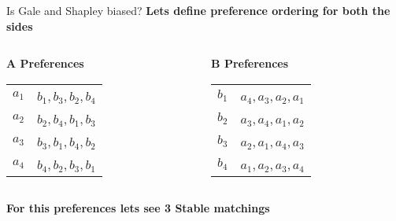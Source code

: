 \documentclass[aspectratio=169,xcolor=dvipsnames]{beamer}
\begin{document}
\begin{frame}{Is Gale and Shapley biased?}
\small
\textbf{Lets define preference ordering for both the sides}

\begin{columns}[t]
    \begin{column}{0.45\textwidth}
      \textbf{A Preferences}\\[6pt]
      \begin{tabular}{r@{: }l}
        $a_1$ & $b_1$,\,$b_3$,\,$b_2$,\,$b_4$ \\
        $a_2$ & $b_2$,\,$b_4$,\,$b_1$,\,$b_3$ \\
        $a_3$ & $b_3$,\,$b_1$,\,$b_4$,\,$b_2$ \\
        $a_4$ & $b_4$,\,$b_2$,\,$b_3$,\,$b_1$ \\
      \end{tabular}
    \end{column}

    \begin{column}{0.45\textwidth}
      \textbf{B Preferences}\\[6pt]
      \begin{tabular}{r@{: }l}
        $b_1$ & $a_4$,\,$a_3$,\,$a_2$,\,$a_1$ \\
        $b_2$ & $a_3$,\,$a_4$,\,$a_1$,\,$a_2$ \\
        $b_3$ & $a_2$,\,$a_1$,\,$a_4$,\,$a_3$ \\
        $b_4$ & $a_1$,\,$a_2$,\,$a_3$,\,$a_4$ \\
      \end{tabular}
    \end{column}
  \end{columns}
\pause
\textbf{For this preferences lets see 3 Stable matchings}

\begin{center}
\end{center}
\end{frame}
\end{document}
